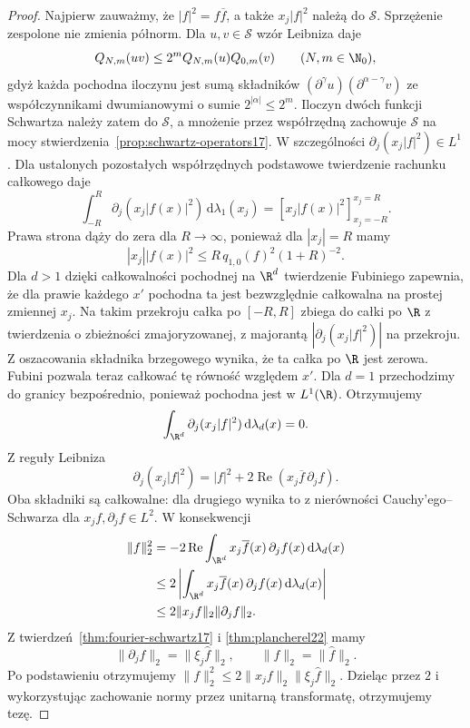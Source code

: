 \begin{proof}
Najpierw zauważmy, że $|f|^2=f\overline f$,
a także $x_j|f|^2$ należą do $\mathcal S$.
Sprzężenie zespolone nie zmienia półnorm.
Dla $u,v\in\mathcal S$ wzór Leibniza daje
\[
 Q_{N,m}(uv)\le 2^m Q_{N,m}(u)Q_{0,m}(v)
 \qquad(N,m\in\N_0),
\]
gdyż każda pochodna iloczynu jest sumą składników
$(\partial^\gamma u)(\partial^{\alpha-\gamma}v)$
ze współczynnikami dwumianowymi o sumie $2^{|\alpha|}\le2^m$.
Iloczyn dwóch funkcji Schwartza należy zatem do
$\mathcal S$, a mnożenie przez współrzędną zachowuje
$\mathcal S$ na mocy stwierdzenia~\ref{prop:schwartz-operators17}.
W szczególności $\partial_j(x_j|f|^2)\in L^1$.
Dla ustalonych pozostałych współrzędnych
podstawowe twierdzenie rachunku całkowego daje
\[
 \int_{-R}^R\partial_j(x_j|f(x)|^2)
 \,\mathrm d\lambda_1(x_j)
 =\left[x_j|f(x)|^2\right]_{x_j=-R}^{x_j=R}.
\]
Prawa strona dąży do zera dla $R\to\infty$,
ponieważ dla $|x_j|=R$ mamy
\[
 |x_j||f(x)|^2
 \le R\,q_{1,0}(f)^2(1+R)^{-2}.
\]
Dla $d>1$ dzięki całkowalności pochodnej
na $\R^d$ twierdzenie Fubiniego zapewnia, że
dla prawie każdego $x'$ pochodna ta jest
bezwzględnie całkowalna na prostej zmiennej $x_j$.
Na takim przekroju całka po $[-R,R]$ zbiega
do całki po $\R$ z twierdzenia o zbieżności
zmajoryzowanej, z majorantą
$|\partial_j(x_j|f|^2)|$ na przekroju.
Z oszacowania składnika brzegowego wynika,
że ta całka po $\R$ jest zerowa. Fubini
pozwala teraz całkować tę równość względem $x'$.
Dla $d=1$ przechodzimy do granicy bezpośrednio,
ponieważ pochodna jest w $L^1(\R)$.
Otrzymujemy
\[
 \int_{\R^d}\partial_j(x_j|f|^2)
 \,\mathrm d\lambda_d(x)=0.
\]
Z reguły Leibniza
\[
 \partial_j(x_j|f|^2)
 =|f|^2+2\operatorname{Re}(x_j\overline f\,\partial_j f).
\]
Oba składniki są całkowalne: dla drugiego
wynika to z nierówności Cauchy'ego--Schwarza
dla $x_jf,\partial_j f\in L^2$.
W konsekwencji
\[
 \begin{aligned}
 \|f\|_2^2
 &=-2\operatorname{Re}
 \int_{\R^d}x_j\overline f(x)\,\partial_j f(x)
 \,\mathrm d\lambda_d(x)\\
 &\le 2\left|
 \int_{\R^d}x_j\overline f(x)\,\partial_j f(x)
 \,\mathrm d\lambda_d(x)\right|\\
 &\le 2\|x_j f\|_2\|\partial_j f\|_2.
 \end{aligned}
\]
Z twierdzeń~\ref{thm:fourier-schwartz17}
i \ref{thm:plancherel22} mamy
\[
 \|\partial_j f\|_2=\|\xi_j\widehat f\|_2,
 \qquad
 \|f\|_2=\|\widehat f\|_2.
\]
Po podstawieniu otrzymujemy
$\|f\|_2^2\le2\|x_jf\|_2\|\xi_j\widehat f\|_2$.
Dzieląc przez $2$ i wykorzystując zachowanie normy
przez unitarną transformatę, otrzymujemy tezę.


\end{proof}
